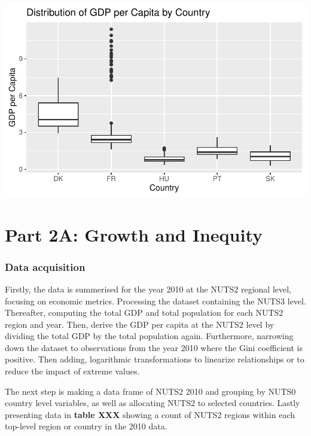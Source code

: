 \documentclass[
  a4paper,
  DIV=11,
  numbers=noendperiod]{scrartcl}
\begin{document}
\includegraphics{MSB104_GR_1_Final_Assignment_research_article_files/figure-pdf/unnamed-chunk-25-1.pdf}

\hypertarget{part-2a-growth-and-inequity}{%
\section{Part 2A: Growth and
Inequity}\label{part-2a-growth-and-inequity}}

\hypertarget{data-acquisition}{%
\subsubsection{\texorpdfstring{\textbf{Data
acquisition}}{Data acquisition}}\label{data-acquisition}}

Firstly, the data is summerised for the year 2010 at the NUTS2 regional
level, focusing on economic metrics. Processing the dataset containing
the NUTS3 level. Thereafter, computing the total GDP and total
population for each NUTS2 region and year. Then, derive the GDP per
capita at the NUTS2 level by dividing the total GDP by the total
population again. Furthermore, narrowing down the dataset to
observations from the year 2010 where the Gini coefficient is positive.
Then adding, logarithmic transformations to linearize relationships or
to reduce the impact of extreme values.

The next step is making a data frame of NUTS2 2010 and grouping by NUTS0
country level variables, as well as allocating NUTS2 to selected
countries. Lastly presenting data in \textbf{table XXX} showing a count
of NUTS2 regions within each top-level region or country in the 2010
data.
\end{document}
